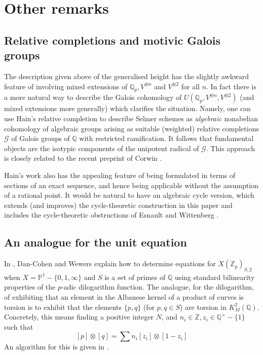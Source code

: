\documentclass[11pt]{amsart}
\def\Z{\mathbb Z}
\def\Q{\mathbb Q}
\theoremstyle{plain}
\theoremstyle{definition}
\begin{document}
\section{Other remarks}\label{sec:rubbish}
\subsection{Relative completions and motivic Galois groups}
The description given above of the generalised height has the slightly awkward feature of involving mixed extensions of $\Q _p ,V^{\oplus n}$ and $V^{\otimes 2}$ for all $n$. In fact there is a more natural way to describe the Galois cohomology of $U(\Q _p ,V^{\oplus n},V^{\otimes 2})$ (and mixed extensions more generally) which clarifies the situation. Namely, one can use Hain's relative completion \cite{hain:non} to describe Selmer schemes as \textit{algebraic} nonabelian cohomology of algebraic groups arising as suitable (weighted) relative completions $\mathcal{G}$ of Galois groups of $\Q $ with restricted ramification. It follows that fundamental objects are the isotypic components of the unipotent radical of $\mathcal{G}$. This approach is closely related to the recent preprint of Corwin \cite{corwin}.

Hain's work also has the appealing feature of being formulated in terms of sections of an exact sequence, and hence being applicable without the assumption of a rational point. It would be natural to have an algebraic cycle version, which extends (and improves) the cycle-theoretic construction in this paper and includes the cycle-theoretic obstructions of Esnault and Wittenberg \cite{EW}.
\subsection{An analogue for the unit equation}\label{subsec:BS}
In \cite{DCW}, Dan-Cohen and Wewers explain how to determine equations for $X(\Z _p )_{S,2}$ when $X=\mathbb{P}^1 -\{ 0,1,\infty \}$ and $S$ is a set of primes of $\Q $ using standard bilinearity properties of the $p$-adic dilogarithm function. The analogue, for the dilogarithm, of exhibiting that an element in the Albanese kernel of a product of curves is torsion is to exhibit that the elements $\{ p,q\}$ (for $p,q\in S$) are torsion in $K_M ^2 (\Q )$. Concretely, this means finding a positive integer $N$, and $n_i \in \Z ,z_i \in \Q ^\times -\{ 1\}$ such that
\[
[p] \otimes [q]= \sum n_i [z_i ]\otimes [1-z_i ]
\]
An algorithm for this is given in \cite{milnor}.
\end{document}
